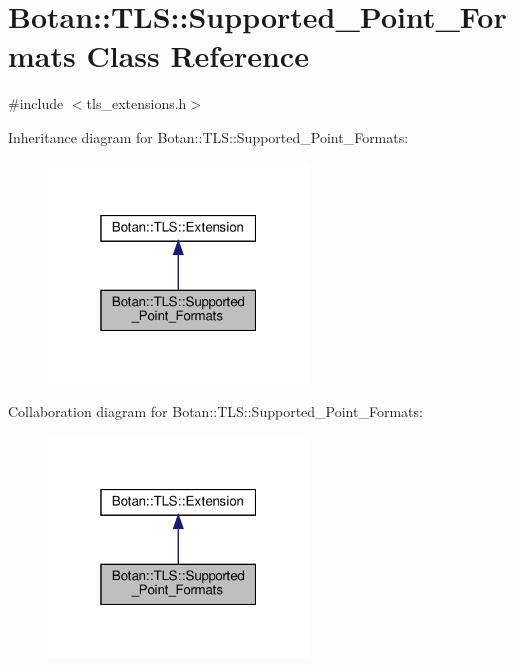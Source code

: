 \hypertarget{class_botan_1_1_t_l_s_1_1_supported___point___formats}{}\section{Botan\+:\+:T\+LS\+:\+:Supported\+\_\+\+Point\+\_\+\+Formats Class Reference}
\label{class_botan_1_1_t_l_s_1_1_supported___point___formats}


{\ttfamily \#include $<$tls\+\_\+extensions.\+h$>$}



Inheritance diagram for Botan\+:\+:T\+LS\+:\+:Supported\+\_\+\+Point\+\_\+\+Formats\+:
\nopagebreak
\begin{figure}[H]
\begin{center}
\leavevmode
\includegraphics[width=196pt]{class_botan_1_1_t_l_s_1_1_supported___point___formats__inherit__graph}
\end{center}
\end{figure}


Collaboration diagram for Botan\+:\+:T\+LS\+:\+:Supported\+\_\+\+Point\+\_\+\+Formats\+:
\nopagebreak
\begin{figure}[H]
\begin{center}
\leavevmode
\includegraphics[width=196pt]{class_botan_1_1_t_l_s_1_1_supported___point___formats__coll__graph}
\end{center}
\end{figure}
